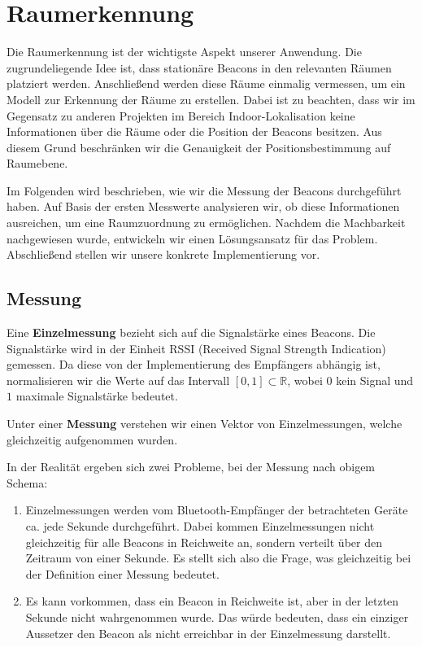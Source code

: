 \section{Raumerkennung}

Die Raumerkennung ist der wichtigste Aspekt unserer Anwendung.
Die zugrundeliegende Idee ist, dass stationäre Beacons in den
relevanten Räumen platziert werden. Anschließend werden diese
Räume einmalig vermessen, um ein Modell zur Erkennung der
Räume zu erstellen.
Dabei ist zu beachten, dass wir im Gegensatz zu anderen Projekten
im Bereich Indoor-Lokalisation keine Informationen über die
Räume oder die Position der Beacons besitzen. Aus diesem Grund
beschränken wir die Genauigkeit der Positionsbestimmung auf
Raumebene.

Im Folgenden wird beschrieben, wie wir die Messung der Beacons
durchgeführt haben. Auf Basis der ersten Messwerte analysieren
wir, ob diese Informationen ausreichen, um eine Raumzuordnung
zu ermöglichen. Nachdem die Machbarkeit nachgewiesen wurde,
entwickeln wir einen Lösungsansatz für das Problem.
Abschließend stellen wir unsere konkrete Implementierung vor.

\subsection{Messung}

Eine \textbf{Einzelmessung} bezieht sich auf die Signalstärke eines Beacons.
Die Signalstärke wird in der Einheit RSSI (Received Signal Strength Indication)
gemessen. Da diese von der Implementierung des Empfängers abhängig ist,
normalisieren wir die Werte auf das Intervall $[0, 1] \subset \mathbb{R}$, wobei
$0$ kein Signal und $1$ maximale Signalstärke bedeutet.

Unter einer \textbf{Messung} verstehen wir einen Vektor von Einzelmessungen,
welche gleichzeitig aufgenommen wurden.


In der Realität ergeben sich zwei Probleme, bei der Messung nach obigem
Schema:
\begin{enumerate}
	\item Einzelmessungen werden vom Bluetooth-Empfänger der betrachteten
	  Geräte ca. jede Sekunde durchgeführt. Dabei kommen Einzelmessungen nicht
	  gleichzeitig für alle Beacons in Reichweite an, sondern verteilt über
	  den Zeitraum von einer Sekunde. Es stellt sich also die Frage, was
	  gleichzeitig bei der Definition einer Messung bedeutet.
	\item Es kann vorkommen, dass ein Beacon in Reichweite ist, aber in der
	  letzten Sekunde nicht wahrgenommen wurde. Das würde bedeuten, dass ein
	  einziger Aussetzer den Beacon als nicht erreichbar in der Einzelmessung
	  darstellt.
\end{enumerate}

